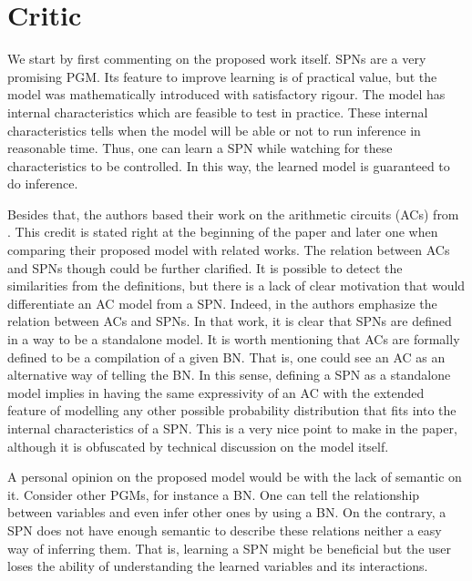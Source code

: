 \section{Critic}
\label{sec:new}

We start by first commenting on the proposed work itself.
SPNs are a very promising PGM.
Its feature to improve learning is of practical value, but the model was mathematically introduced with satisfactory rigour.
The model has internal characteristics which are feasible to test in practice.
These internal characteristics tells when the model will be able or not to run inference in reasonable time.
Thus, one can learn a SPN while watching for these characteristics to be controlled.
In this way, the learned model is guaranteed to do inference.

Besides that, the authors based their work on the arithmetic circuits (ACs) from \cite{Darwiche2009}.
This credit is stated right at the beginning of the paper and later one when comparing their proposed model with related works.
The relation between ACs and SPNs though could be further clarified.
It is possible to detect the similarities from the definitions, but there is a lack of clear motivation that would differentiate an AC model from a SPN.
Indeed, in \cite{Zhao2015} the authors emphasize the relation between ACs and SPNs.
In that work, it is clear that SPNs are defined in a way to be a standalone model.
It is worth mentioning that ACs are formally defined to be a compilation of a given BN.
That is, one could see an AC as an alternative way of telling the BN.
In this sense, defining a SPN as a standalone model implies in having the same expressivity of an AC with the extended feature of modelling any other possible probability distribution that fits into the internal characteristics of a SPN.
This is a very nice point to make in the paper, although it is obfuscated by technical discussion on the model itself.

A personal opinion on the proposed model would be with the lack of semantic on it.
Consider other PGMs, for instance a BN.
One can tell the relationship between variables and even infer other ones by using a BN.
On the contrary, a SPN does not have enough semantic to describe these relations neither a easy way of inferring them.
That is, learning a SPN might be beneficial but the user loses the ability of understanding the learned variables and its interactions.

